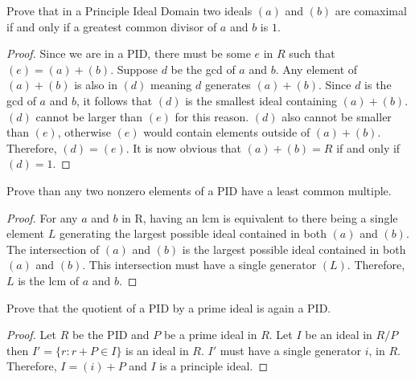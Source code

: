 \documentclass[10pt]{article}
\newenvironment{problem}[2][Problem]{\begin{trivlist}
		\item[\hskip \labelsep {\bfseries #1}\hskip \labelsep {\bfseries #2.}]}{\end{trivlist}}
\begin{document}
	\begin{problem}{2.1}
		Prove that in a Principle Ideal Domain two ideals $(a)$ and $(b)$ are comaximal if and only if a greatest common divisor of $a$ and $b$ is $1$.
		\begin{proof}
			 Since we are in a PID, there must be some $e$ in $R$ such that $(e) = (a) + (b)$. Suppose $d$ be the gcd of $a$ and $b$. Any element of $(a) + (b)$ is also in $(d)$ meaning $d$ generates $(a) + (b)$. Since $d$ is the gcd of $a$ and $b$, it follows that $(d)$ is the smallest ideal containing $(a) + (b)$. $(d)$ cannot be larger than $(e)$ for this reason. $(d)$ also cannot be smaller than $(e)$, otherwise $(e)$ would contain elements outside of $(a) + (b)$. Therefore, $(d) = (e)$. It is now obvious that $(a) + (b) = R$ if and only if $(d) = 1$. 
		\end{proof}
	\end{problem}
	
	\begin{problem}{2.2}
		Prove than any two nonzero elements of a PID have a least common multiple.
		\begin{proof}
			For any $a$ and $b$ in R, having an lcm is equivalent to there being a single element $L$ generating the largest possible ideal contained in both $(a)$ and $(b)$. The intersection of $(a)$ and $(b)$ is the largest possible ideal contained in both $(a)$ and $(b)$. This intersection must have a single generator $(L)$. Therefore, $L$ is the lcm of $a$ and $b$. 
		\end{proof}
	\end{problem}
	
	\begin{problem}{1.3}
		Prove that the quotient of a PID by a prime ideal is again a PID.
		\begin{proof}
			Let $R$ be the PID and $P$ be a prime ideal in $R$. Let $I$ be an ideal in $R/P$ then $I' = \{r : r + P \in I\}$ is an ideal in $R$. $I'$ must have a single generator $i$, in $R$. Therefore, $I = (i) + P$ and $I$ is a principle ideal. 
		\end{proof}
	\end{problem}
	
\end{document}
